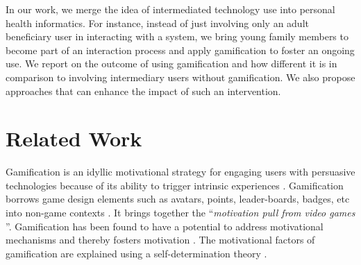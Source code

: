 \documentclass{sig-alternate}
\begin{document}
In our work, we merge the idea of intermediated technology use into personal health informatics. For instance, instead of just involving only an adult beneficiary user in interacting with a system, we bring young family members to become part of an interaction process and apply gamification to foster an ongoing use. We report on the outcome of using gamification and how different it is in comparison to involving intermediary users without gamification. We also propose approaches that can enhance the impact of such an intervention.
\section{Related Work} 
Gamification is an idyllic motivational strategy for engaging users with persuasive technologies because of its ability to trigger intrinsic experiences \cite{hamari2014persuasive}. Gamification borrows game design elements such as avatars, points, leader-boards, badges, etc into non-game contexts \cite{deterding2011game}. It brings together the ``\emph{motivation pull from video games} \cite{ryan2006:motivationalpull}''. Gamification has been found to have a potential to address motivational mechanisms and thereby fosters motivation \cite{sailer2013:psychological}. The motivational  factors of gamification are explained using a self-determination theory \cite{deci1985:intrinsic}.    
\end{document}
